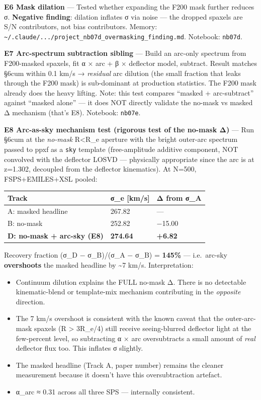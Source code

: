 \documentclass[
  10pt,
]{article}
\providecommand{\tightlist}{%
  \setlength{\itemsep}{0pt}\setlength{\parskip}{0pt}}
\begin{document}
\textbf{E6 Mask dilation} --- Tested whether expanding the F200 mask further reduces σ. \textbf{Negative finding}: dilation inflates σ via noise --- the dropped spaxels are S/N contributors, not bias
contributors. Memory: \texttt{\textasciitilde{}/.claude/.../project\_nb07d\_overmasking\_finding.md}. Notebook: \texttt{nb07d}.

\textbf{E7 Arc-spectrum subtraction sibling} --- Build an arc-only spectrum from F200-masked spaxels, fit α × arc + β × deflector model, subtract. Result matches §6cum within 0.1 km/s →
\emph{residual} arc dilution (the small fraction that leaks through the F200 mask) is sub-dominant at production statistics. The F200 mask already does the heavy lifting. Note: this test compares
``masked + arc-subtract'' against ``masked alone'' --- it does NOT directly validate the no-mask vs masked Δ mechanism (that's E8). Notebook: \texttt{nb07e}.

\textbf{E8 Arc-as-sky mechanism test (rigorous test of the no-mask Δ)} --- Run §6cum at the \emph{no-mask} R\textless R\_e aperture with the bright outer-arc spectrum passed to ppxf as a \texttt{sky}
template (free-amplitude additive component, NOT convolved with the deflector LOSVD --- physically appropriate since the arc is at z=1.302, decoupled from the deflector kinematics). At N=500,
FSPS+EMILES+XSL pooled:

\begingroup\small\setlength{\tabcolsep}{4pt}\begin{longtable}[]{@{}lll@{}}
\toprule
Track & σ\_e {[}km/s{]} & Δ from σ\_A \\
\midrule
\endhead
A: masked headline & 267.82 & --- \\
B: no-mask & 252.82 & −15.00 \\
\textbf{D: no-mask + arc-sky (E8)} & \textbf{274.64} & \textbf{+6.82} \\
\bottomrule
\end{longtable}\endgroup

Recovery fraction (σ\_D − σ\_B)/(σ\_A − σ\_B) = \textbf{145\%} --- i.e.~arc-sky \textbf{overshoots} the masked headline by \textasciitilde7 km/s. Interpretation:

\begin{itemize}
\tightlist
\item
  Continuum dilution explains the FULL no-mask Δ. There is no detectable kinematic-blend or template-mix mechanism contributing in the \emph{opposite} direction.
\item
  The 7 km/s overshoot is consistent with the known caveat that the outer-arc-mask spaxels (R \textgreater{} 3R\_e/4) still receive seeing-blurred deflector light at the few-percent level, so
  subtracting α × arc oversubtracts a small amount of \emph{real} deflector flux too. This inflates σ slightly.
\item
  The masked headline (Track A, paper number) remains the cleaner measurement because it doesn't have this oversubtraction artefact.
\item
  α\_arc ≈ 0.31 across all three SPS --- internally consistent.
\end{itemize}
\end{document}
